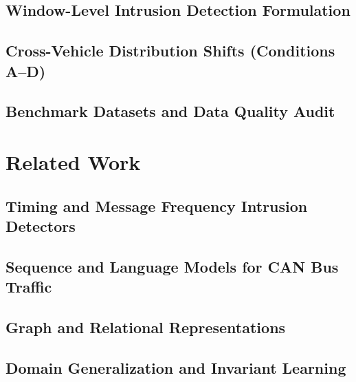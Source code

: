 \documentclass[12pt, a4paper, reqno, oneside]{book}
\begin{document}
\section{Window-Level Intrusion Detection Formulation}
\label{sec:bg_windowing}

\section{Cross-Vehicle Distribution Shifts (Conditions A--D)}
\label{sec:bg_conditions}

\section{Benchmark Datasets and Data Quality Audit}
\label{sec:bg_datasets}

\chapter{Related Work}
\label{chap:related}

\section{Timing and Message Frequency Intrusion Detectors}
\label{sec:rw_timing}

\section{Sequence and Language Models for CAN Bus Traffic}
\label{sec:rw_sequence}

\section{Graph and Relational Representations}
\label{sec:rw_graphs}

\section{Domain Generalization and Invariant Learning}
\label{sec:rw_domain_generalization}
\end{document}
